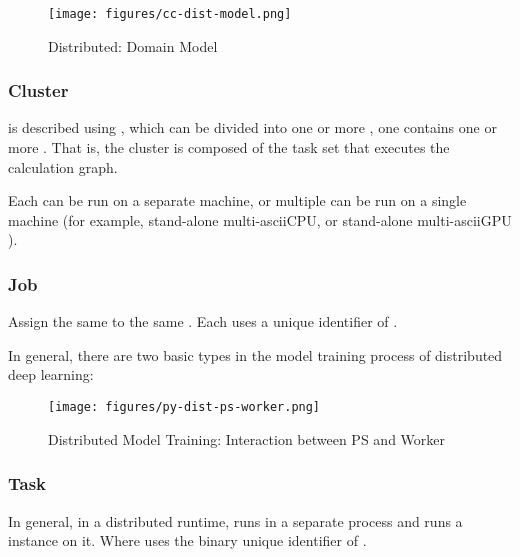 \begin{content}
\begin{figure}[H]
\centering
\texttt{[image: figures/cc-dist-model.png]}
\caption{Distributed: Domain Model}
 \label{fig:cc-dist-model}
\end{figure}

\subsubsection{Cluster}

 is described using , which can be divided into one or more , one  contains one or more . That is, the  cluster is composed of the task set  that executes the calculation graph.

Each  can be run on a separate machine, or multiple  can be run on a single machine (for example, stand-alone multi-ascii{CPU}, or stand-alone multi-ascii{GPU} ).

\subsubsection{Job}

Assign the same  to the same . Each  uses a unique identifier of .

In general, there are two basic  types in the model training process of distributed deep learning:

\begin{enum}
\end{enum}

\begin{figure}[H]
\centering
\texttt{[image: figures/py-dist-ps-worker.png]}
\caption{Distributed Model Training: Interaction between PS and Worker}
 \label{fig:py-dist-ps-worker}
\end{figure}

\subsubsection{Task}

In general, in a distributed runtime,  runs in a separate process and runs a  instance on it. Where  uses the binary unique identifier of .


\end{content}
